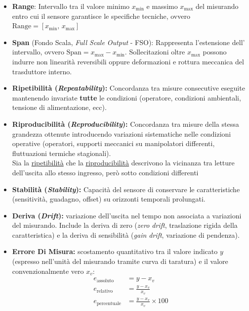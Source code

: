 ﻿\documentclass[11pt, a4paper]{article}
\begin{document}
\newpage
\begin{itemize}
    \item \textbf{Range}: Intervallo tra il valore minimo $x_{\min}$ e massimo $x_{\max}$ del misurando entro cui il sensore garantisce le specifiche tecniche, ovvero $\text{Range} = [x_{\min}, \, x_{\max}]$
    \item \textbf{Span} (Fondo Scala, \textit{Full Scale Output} - FSO): Rappresenta l'estensione dell' intervallo, ovvero $\text{Span} = x_{\max} - x_{\min}$.   Sollecitazioni oltre $x_{\max}$ possono indurre non linearità reversibili oppure deformazioni e rottura meccanica del trasduttore interno.
    \item \textbf{Ripetibilità (\textit{Repeatability}):} Concordanza tra misure consecutive eseguite mantenendo invariate \textbf{tutte} le condizioni (operatore, condizioni ambientali, tensione di alimentazione, ecc).
    \item \textbf{Riproducibilità (\textit{Reproducibility}):} Concordanza tra misure della stessa grandezza ottenute introducendo variazioni sistematiche nelle condizioni operative (operatori, supporti meccanici su manipolatori differenti, fluttuazioni termiche stagionali). \\
    Sia la \underline{ripetibilità} che la \underline{riproducibilità} descrivono la vicinanza tra letture dell'uscita allo stesso ingresso, però sotto condizioni differenti
    \item \textbf{Stabilità (\textit{Stability}):}  Capacità del sensore di conservare le caratteristiche (sensitività, guadagno, offset) su orizzonti temporali prolungati.
    \item \textbf{Deriva (\textit{Drift}):} variazione dell'uscita nel tempo non associata a variazioni del misurando. Include la deriva di zero (\textit{zero drift}, traslazione rigida della caratteristica) e la deriva di sensibilità (\textit{gain drift}, variazione di pendenza).
    \item \textbf{Errore Di Misura:}  scostamento quantitativo tra il valore indicato $y$ (espresso nell'unità del misurando tramite curva di taratura) e il valore convenzionalmente vero $x_v$:
        \begin{align*}
            e_{\text{assoluto}} &= y - x_v\\
            e_{\text{relativo}} &= \frac{y - x_v}{x_v}\\
            e_{\text{percentuale}} &= \frac{y - x_v}{x_v} \times 100
        \end{align*}
\end{itemize}
\end{document}
